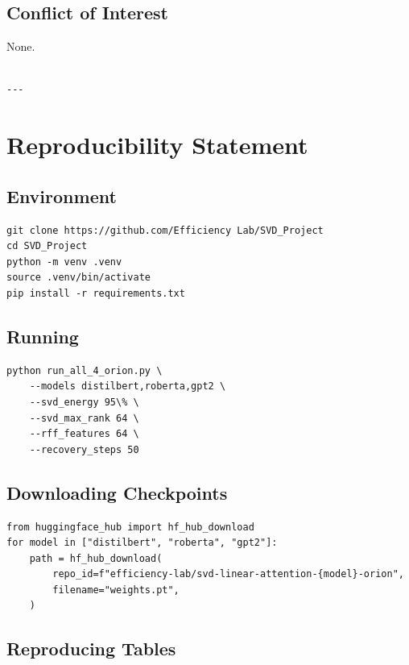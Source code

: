 \subsection{Conflict of Interest}

None.
\begin{lstlisting}

---
\end{lstlisting}


\section{Reproducibility Statement}

\subsection{Environment}

\begin{lstlisting}
git clone https://github.com/Efficiency Lab/SVD_Project
cd SVD_Project
python -m venv .venv
source .venv/bin/activate
pip install -r requirements.txt
\end{lstlisting}

\subsection{Running}

\begin{lstlisting}
python run_all_4_orion.py \
    --models distilbert,roberta,gpt2 \
    --svd_energy 95\% \
    --svd_max_rank 64 \
    --rff_features 64 \
    --recovery_steps 50
\end{lstlisting}

\subsection{Downloading Checkpoints}

\begin{lstlisting}
from huggingface_hub import hf_hub_download
for model in ["distilbert", "roberta", "gpt2"]:
    path = hf_hub_download(
        repo_id=f"efficiency-lab/svd-linear-attention-{model}-orion",
        filename="weights.pt",
    )
\end{lstlisting}

\subsection{Reproducing Tables}

